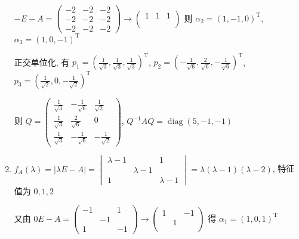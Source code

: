 \begin{enumerate}
                   \( -E-A = \begin{pmatrix}
                       -2 & -2 & -2 \\
                       -2 & -2 & -2 \\
                       -2 & -2 & -2
                   \end{pmatrix} \rightarrow \begin{pmatrix}
                       1 & 1 & 1 \\
                         &   &   \\
                         &   &
                   \end{pmatrix} \) 则 \( \alpha_{2} = (1, -1, 0)^{\mathrm{T}} \), \( \alpha_{3} = (1, 0, -1)^{\mathrm{T}} \)

                   正交单位化, 有 \( p_{1} = \left( \frac{1}{\sqrt{3}}, \frac{1}{\sqrt{3}}, \frac{1}{\sqrt{3}} \right)^{\mathrm{T}} \), \( p_{2} = \left( -\frac{1}{\sqrt{6}}, \frac{2}{\sqrt{6}}, -\frac{1}{\sqrt{6}} \right)^{\mathrm{T}} \), \( p_{3} = \left( \frac{1}{\sqrt{2}}, 0, -\frac{1}{\sqrt{2}} \right)^{\mathrm{T}} \)

                   则 \( Q = \begin{pmatrix}
                       \frac{1}{\sqrt{3}} & -\frac{1}{\sqrt{6}} & \frac{1}{\sqrt{2}}  \\
                       \frac{1}{\sqrt{3}} & \frac{2}{\sqrt{6}}  & 0                   \\
                       \frac{1}{\sqrt{3}} & -\frac{1}{\sqrt{6}} & -\frac{1}{\sqrt{2}}
                   \end{pmatrix} \), \( Q^{-1}AQ = \operatorname{diag}(5, -1, -1) \)
             \item %
                   \( f_{A}(\lambda) = |\lambda E - A| = \begin{vmatrix}
                       \lambda-1 &           & 1         \\
                                 & \lambda-1 &           \\
                       1         &           & \lambda-1
                   \end{vmatrix} = \lambda(\lambda-1)(\lambda-2) \), 特征值为 \( 0, 1, 2 \)

                   又由 \( 0E-A = \begin{pmatrix}
                       -1 &    & 1  \\
                          & -1 &    \\
                       1  &    & -1
                   \end{pmatrix} \rightarrow \begin{pmatrix}
                       1 &   & -1 \\
                         & 1 &    \\
                         &   &
                   \end{pmatrix} \) 得 \( \alpha_{1} = (1, 0, 1)^{\mathrm{T}} \)


\end{enumerate}
